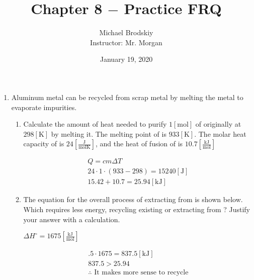 \documentclass[12pt]{article}
\title{Chapter 8 $-$ Practice FRQ}
\date{January 19, 2020}
\author{Michael Brodskiy\\ \small Instructor: Mr. Morgan}
\begin{document}
\maketitle

\begin{enumerate}
  
  \item Aluminum metal can be recycled from scrap metal by melting the metal to evaporate impurities.

    \begin{enumerate}

      \item Calculate the amount of heat needed to purify $1[\si{\mole}]$ of  originally at $298[\si{\kelvin}]$ by melting it. The melting point of  is $933[\si{\kelvin}]$. The molar heat capacity of  is $24\left[ \frac{\si{\joule}}{\si{\mole\kelvin}} \right]$, and the heat of fusion of  is $10.7\left[ \frac{\si{\kilo\joule}}{\si{\mole}} \right]$

        \begin{equation}
          \begin{split}
            Q=cm\Delta T\\
            24\cdot1\cdot(933-298)=15240[\si{\joule}]\\
            15.42+10.7=25.94[\si{\kilo\joule}]
            \end{split}
          \label{1}
        \end{equation}

      \item The equation for the overall process of extracting  from  is shown below. Which requires less energy, recycling existing  or extracting  from ? Justify your answer with a calculation.

        \begin{center}
          \quad\quad$\Delta H^{\circ}=1675\left[ \frac{\si{\kilo\joule}}{\si{\mole}} \right]$
        \end{center}

        \begin{equation}
          \begin{split}
            .5\cdot1675=837.5[\si{\kilo\joule}]\\
            837.5>25.94\\
          \therefore\text{ It makes more sense to recycle}\\
          \end{split}
          \label{2}
        \end{equation}

    \end{enumerate}

\end{enumerate}
\end{document}
